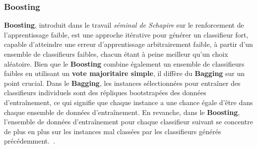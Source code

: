 \subsubsection{Boosting}
\textbf{Boosting}, introduit dans le travail \textit{séminal de Schapire} sur le renforcement de l'apprentissage faible, est une approche itérative pour générer un classifieur fort, capable d'atteindre une erreur d'apprentissage arbitrairement faible, à partir d'un ensemble de classifieurs faibles, chacun étant à peine meilleur qu'un choix aléatoire. Bien que le \textbf{Boosting} combine également un ensemble de classifieurs faibles en utilisant un \textbf{vote majoritaire simple}, il diffère du \textbf{Bagging} sur un point crucial. Dans le \textbf{Bagging}, les instances sélectionnées pour entraîner des classifieurs individuels sont des répliques bootstrapées des données d'entraînement, ce qui signifie que chaque instance a une chance égale d'être dans chaque ensemble de données d'entraînement. En revanche, dans le \textbf{Boosting}, l'ensemble de données d'entraînement pour chaque classifieur suivant se concentre de plus en plus sur les instances mal classées par les classifieurs générés précédemment.~\cite{polikar2012ensemble}.
